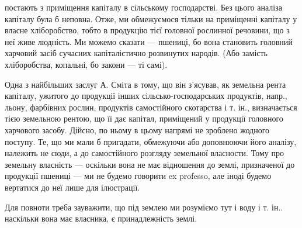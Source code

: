 \parcont{}  %
постають з приміщення капіталу в сільському господарстві. Без цього аналіза
капіталу була б неповна. Отже, ми обмежуємося тільки на приміщенні капіталу
у власне хліборобство, тобто в продукцію тієї головної рослинної речовини, що
з неї живе людність. Ми можемо сказати — пшениці, бо вона становить головний
харчовий засіб сучасних капіталістично розвинутих народів. (Або замість
хліборобства, копальні, бо закони — ті самі).

Одна з найбільших заслуг А. Сміта в тому, що він з’ясував, як земельна
рента капіталу, ужитого до продукції інших сільсько-господарських продуктів,
напр., льону, фарбівних рослин, продуктів самостійного скотарства і т. ін., визначається
тією земельною рентою, що її дає капітал, приміщений у продукції
головного харчового засобу. Дійсно, по ньому в цьому напрямі не зроблено жодного
поступу. Те, що ми мали б пригадати, обмежуючи або доповнюючи його
аналізу, належить не сюди, а до самостійного розгляду земельної власности.
Тому про земельну власність — оскільки вона не має відношення до землі, призначеної
до продукції пшениці — ми не будемо говорити ex professo, але іноді
будемо вертатися до неї лише для ілюстрації.

Для повноти треба зауважити, що під землею ми розуміємо тут і воду і т. ін..
наскільки вона має власника, є принадлежність землі.

